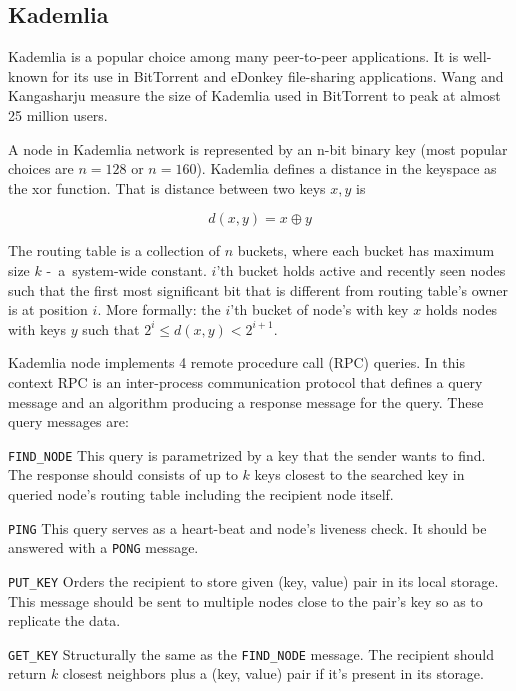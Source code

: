   \subsection{Kademlia}
  Kademlia \cite{may02} is a popular choice among many peer-to-peer
  applications. It is well-known for its use in BitTorrent and eDonkey
  file-sharing applications. Wang and Kangasharju \cite{wan13} measure the size
  of Kademlia used in BitTorrent to peak at almost 25 million users.

  A node in Kademlia network is represented by an n-bit binary key (most popular
  choices are $n = 128$ or $n = 160$). Kademlia defines a distance in the
  keyspace as the xor function. That is distance between two keys $x, y$ is

  \[ d(x, y) = x \oplus y\]

  The routing table is a collection of $n$ buckets, where each bucket has
  maximum size $k$ -~a~\mbox{system-wide} constant. 
  $i$'th bucket holds active and recently seen nodes such that the first most
  significant bit that is different from routing table's owner is at position
  $i$. More formally: the $i$'th bucket of node's with key $x$ holds nodes with
  keys $y$ such that $2^i \leq d(x, y) < 2^{i+1}$.

  Kademlia node implements 4 remote procedure call (RPC) queries. In this
  context RPC is an inter-process communication protocol that defines a query
  message and an algorithm producing a response message for the query. These
  query messages are:

  \begin{description}
    \item{\texttt{FIND\_NODE}} This query is parametrized by a key that the sender
      wants to find. The response should consists of up to $k$ keys closest to
      the searched key in queried node's routing table including the recipient
      node itself.
    \item{\texttt{PING}} This query serves as a heart-beat and node's liveness
      check. It should be answered with a \texttt{PONG} message.
    \item{\texttt{PUT\_KEY}} Orders the recipient to store given (key, value) pair
      in its local storage. This message should be sent to multiple nodes close
      to the pair's key so as to replicate the data.
    \item{\texttt{GET\_KEY}} Structurally the same as the \texttt{FIND\_NODE}
      message. The recipient should return $k$ closest neighbors plus a (key,
      value) pair if it's present in its storage.
  \end{description}


